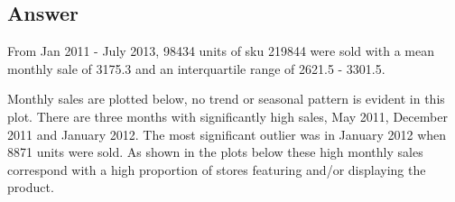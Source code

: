 \documentclass[
  11pt,
]{article}
\begin{document}
\hypertarget{answer}{%
\subsection{Answer}\label{answer}}

From Jan 2011 - July 2013, 98434 units of sku 219844 were sold with a
mean monthly sale of 3175.3 and an interquartile range of 2621.5 -
3301.5.

Monthly sales are plotted below, no trend or seasonal pattern is evident
in this plot. There are three months with significantly high sales, May
2011, December 2011 and January 2012. The most significant outlier was
in January 2012 when 8871 units were sold. As shown in the plots below
these high monthly sales correspond with a high proportion of stores
featuring and/or displaying the product.
\end{document}
